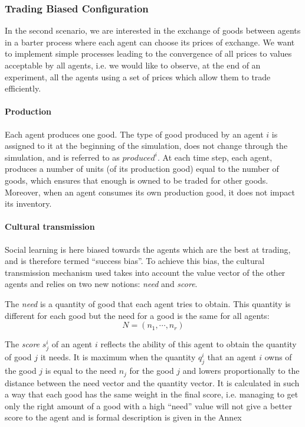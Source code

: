 \documentclass[a4paper]{article}
\begin{document}
\subsubsection{Trading Biased Configuration}\label{sec:tc:trade}

In the second scenario, we are interested in the exchange of goods between agents in a barter process where each agent can choose its prices of exchange. We want to implement simple processes leading to the convergence of all prices to values acceptable by all agents, i.e. we would like to observe, at the end of an experiment, all the agents using a set of prices which allow them to trade efficiently.

\paragraph{Production} Each agent produces one good. The type of good produced by an agent $i$ is assigned to it at the beginning of the simulation, does not change through the simulation, and is referred to as $produced^i$. At each time step, each agent, produces a number of units (of its production good) equal to the number of goods, which ensures that enough is owned to be traded for other goods. Moreover, when an agent consumes its own production good, it does not impact its inventory.

\paragraph{Cultural transmission}
Social learning is here biased towards the agents which are the best at trading, and is therefore termed ``success bias''. To achieve this bias, the cultural transmission mechanism used takes into account the value vector of the other agents and relies on two new notions: \emph{need} and \emph{score}. 

The \emph{need} is a quantity of good that each agent tries to obtain. This quantity is different for each good but the need for a good is the same for all agents:
$$ N = (n_1, \cdots, n_r) $$ 

The \emph{score} $s^i_j$ of an agent $i$ reflects the ability of this agent to obtain the quantity of good $j$ it needs. It is maximum when the quantity $q^i_j$ that an agent $i$ owns of the good $j$ is equal to the need $n_j$ for the good $j$ and lowers proportionally to the distance between the need vector and the quantity vector. It is calculated in such a way that each good has the same weight in the final score, i.e. managing to get only the right amount of a good with a high ``need'' value will not give a better score to the agent and is formal description is given in the Annex
\end{document}
